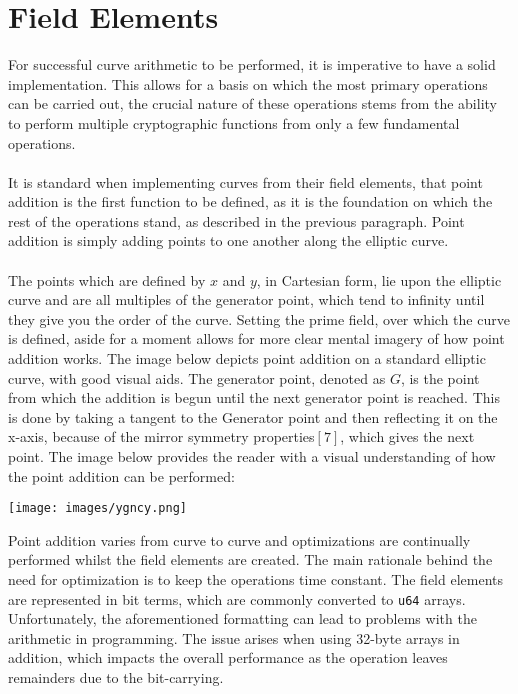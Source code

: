 \documentclass{article}
\begin{document}
\section{Field Elements}
For successful curve arithmetic to be performed, it is imperative to have a solid implementation. This allows for a basis on which the most primary operations can be carried out, the crucial nature of these operations stems from the ability to perform multiple cryptographic functions from only a few fundamental operations. \\\\
It is standard when implementing curves from their field elements, that point addition is the first function to be defined, as it is the foundation on which the rest of the operations stand, as described in the previous paragraph. Point addition is simply adding points to one another along the elliptic curve.\\\\
The points which are defined by $x$ and $y$, in Cartesian form, lie upon the elliptic curve and are all multiples of the generator point, which tend to infinity until they give you the order of the curve. Setting the prime field, over which the curve is defined, aside for a moment allows for more clear mental imagery of how point addition works. The image below depicts point addition on a standard elliptic curve, with good visual aids. The generator point, denoted as $G$, is the point from which the addition is begun until the next generator point is reached. This is done by taking a tangent to the Generator point and then reflecting it on the x-axis, because of the mirror symmetry properties$[7]$, which gives the next point. The image below provides the reader with a visual understanding of how the point addition can be performed:
\begin{center}
\texttt{[image: images/ygncy.png]}
\end{center}
Point addition varies from curve to curve and optimizations are continually performed whilst the field elements are created. The main rationale behind the need for optimization is to keep the operations time constant. The field elements are represented in bit terms, which are commonly converted to \texttt{u64} arrays. Unfortunately, the aforementioned formatting can lead to problems with the arithmetic in programming. The issue arises when using 32-byte arrays in addition, which impacts the overall performance as the operation leaves remainders due to the bit-carrying.\\\\
\end{document}
